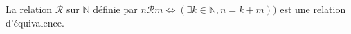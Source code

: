 La relation $\mathcal R$ sur $\mathbb N$ définie par $n\mathcal R m \iff (\exists k\in\mathbb N,n=k+m))$ est une relation d'équivalence.

\begin{reponses}
\end{reponses}

